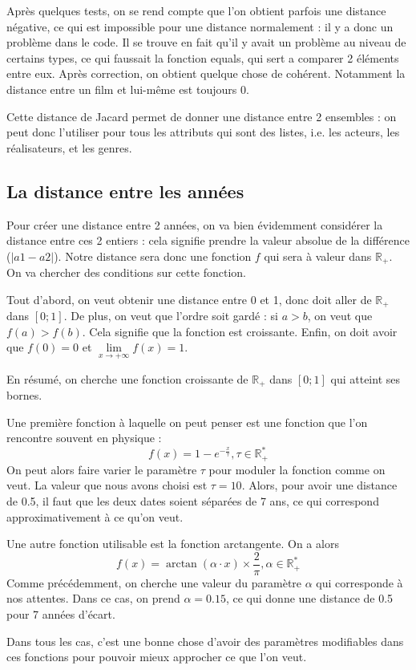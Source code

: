 \documentclass[11pt,a4paper]{report}
\begin{document}
Après quelques tests, on se rend compte que l'on obtient parfois une distance négative, ce qui est impossible pour une distance normalement : il y a donc un problème dans le code. Il se trouve en fait qu'il y avait un problème au niveau de certains types, ce qui faussait la fonction equals, qui sert a comparer 2 éléments entre eux. Après correction, on obtient quelque chose de cohérent. Notamment la distance entre un film et lui-même est toujours 0.\par
Cette distance de Jacard permet de donner une distance entre 2 ensembles : on peut donc l'utiliser pour tous les attributs qui sont des listes, i.e. les acteurs, les réalisateurs, et les genres.

\subsection{La distance entre les années}

Pour créer une distance entre 2 années, on va bien évidemment considérer la distance entre ces 2 entiers : cela signifie prendre la valeur absolue de la différence (\(|a1-a2|\)). Notre distance sera donc une fonction $f$ qui sera à valeur dans $\mathds{R}_{+}$. On va chercher des conditions sur cette fonction.\par
Tout d'abord, on veut obtenir une distance entre 0 et 1, donc doit aller de $\mathds{R}_{+}$ dans \([0;1]\). De plus, on veut que l'ordre soit gardé : si \(a>b\), on veut que \(f(a)>f(b)\). Cela signifie que la fonction est croissante. Enfin, on doit avoir que $f(0)=0$ et $\lim\limits_{x \rightarrow +\infty} f(x)=1$.\par
En résumé, on cherche une fonction croissante de $\mathds{R}_{+}$ dans $[0;1]$ qui atteint ses bornes.\par
Une première fonction à laquelle on peut penser est une fonction que l'on rencontre souvent en physique :
\[f(x)=1-e^{-\frac{x}{\tau}} , \tau \in \mathds{R}_{+}^{*}\]
On peut alors faire varier le paramètre $\tau$ pour moduler la fonction comme on veut. La valeur que nous avons choisi est $\tau=10$. Alors, pour avoir une distance de 0.5, il faut que les deux dates soient séparées de 7 ans, ce qui correspond approximativement à ce qu'on veut.\par
Une autre fonction utilisable est la fonction arctangente. On a alors
\[f(x)=\arctan(\alpha \cdot x)\times \frac{2}{\pi} , \alpha \in \mathds{R}_{+}^{*}\]
Comme précédemment, on cherche une valeur du paramètre $\alpha$ qui corresponde à nos attentes. Dans ce cas, on prend $\alpha=0.15$, ce qui donne une distance de 0.5 pour 7 années d'écart.\par
Dans tous les cas, c'est une bonne chose d'avoir des paramètres modifiables dans ces fonctions pour pouvoir mieux approcher ce que l'on veut.
\end{document}
